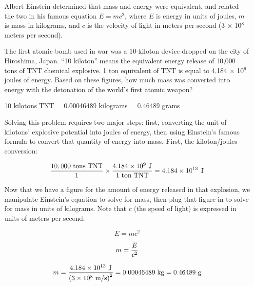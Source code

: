 

Albert Einstein determined that mass and energy were equivalent, and related the two in his famous equation $E = mc^2$, where $E$ is energy in units of joules, $m$ is mass in kilograms, and $c$ is the velocity of light in meters per second (3 $\times$ 10$^{8}$ meters per second).

The first atomic bomb used in war was a 10-kiloton device dropped on the city of Hiroshima, Japan.  ``10 kiloton'' means the equivalent energy release of 10,000 tons of TNT chemical explosive.  1 ton equivalent of TNT is equal to 4.184 $\times$ 10$^{9}$ joules of energy.  Based on these figures, how much mass was converted into energy with the detonation of the world's first atomic weapon?







10 kilotons TNT = 0.00046489 kilograms = 0.46489 grams

\vskip 10pt

Solving this problem requires two major steps: first, converting the unit of kilotons' explosive potential into joules of energy, then using Einstein's famous formula to convert that quantity of energy into mass.  First, the kiloton/joules conversion:

$${10,000 \hbox{ tons TNT} \over 1} \times {4.184 \times 10^9 \hbox{ J} \over 1 \hbox{ ton TNT}} = 4.184 \times 10^{13} \hbox{ J}$$

Now that we have a figure for the amount of energy released in that explosion, we manipulate Einstein's equation to solve for mass, then plug that figure in to solve for mass in units of kilograms.  Note that $c$ (the speed of light) is expressed in units of meters per second:

$$E = mc^2$$

$$m = {E \over c^2}$$

$$m = {{4.184 \times 10^{13} \hbox{ J}} \over \left({3 \times 10^8 \hbox{ m/s}}\right)^2} = 0.00046489 \hbox{ kg} = 0.46489 \hbox{ g}$$











